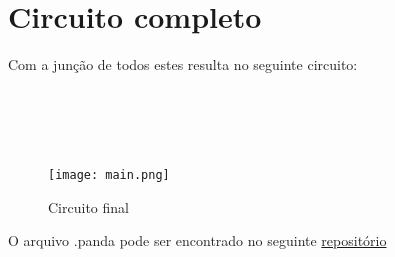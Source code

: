 \documentclass{article}
\begin{document}
\section{Circuito completo}

Com a junção de todos estes resulta no seguinte circuito:
\\
\\
\\
\\
\\

\begin{figure}[!h]
\centering
\texttt{[image: main.png]}
\caption{Circuito final}
\label{fig:CL_logo}
\end{figure}

O arquivo .panda pode ser encontrado no seguinte \href{https://github.com/aamgoulart/circuitosDigitais}{repositório}
\end{document}
